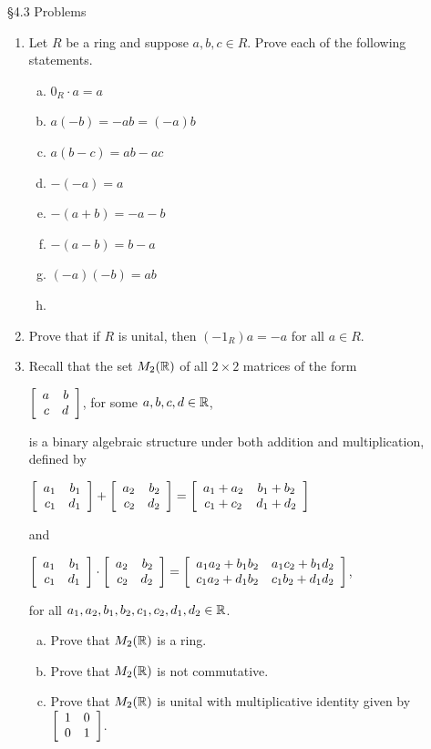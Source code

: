 \documentclass[11pt,fleqn,dvipsnames,usenames]{article}
\begin{document}
{\huge \S4.3 Problems}
\vsp

\begin{enumerate}[1.]
\item Let $R$ be a ring and suppose $a,b,c\in R$.  Prove each of the following statements.
\begin{multicols}{2}
\begin{enumerate}[(a)]
\item $0_{R}\cdot a = a$
\item $a(-b) = -ab = (-a)b$
\item $a(b-c) = ab - ac$
\item $-(-a) = a$
\item $-(a+b) = -a - b$
\item $-(a-b) = b - a$
\item $(-a)(-b) = ab$
\item[\ ] 
\end{enumerate}
\end{multicols}

\item Prove that if $R$ is unital, then $(-1_{R})a = -a$ for all $a\in R$.

\item Recall that the set $M_{2}(\R)$ of all $2\times 2$ matrices of the form
\begin{center}
$\MATRIX{rr}{a & b\\c & d}$, for some $a,b,c,d\in\R$,
\end{center}
is a binary algebraic structure under both addition and multiplication, defined by
\begin{center}
$\MATRIX{rr}{a_1 & b_1\\c_1 & d_1} + \MATRIX{rr}{a_2 & b_2\\c_2 & d_2} = \MATRIX{cc}{a_1 + a_2 & b_1 + b_2\\c_1 + c_2& d_1 + d_2}$
\end{center}
and
\begin{center}
$\MATRIX{rr}{a_1 & b_1\\c_1 & d_1}\cdot \MATRIX{rr}{a_2 & b_2\\c_2 & d_2} = \MATRIX{cc}{a_1a_2 + b_1b_2 & a_1c_2 + b_1d_2\\c_1a_2 + d_1b_2 & c_1b_2 + d_1d_2}$,
\end{center}
for all $a_{1},a_{2},b_{1},b_{2},c_{1},c_{2},d_{1},d_{2}\in\R$.
\vsp
\begin{enumerate}[(a)]
\item Prove that $M_{2}(\R)$ is a ring.
\item Prove that $M_{2}(\R)$ is not commutative.
\item Prove that $M_{2}(\R)$ is unital with multiplicative identity given by $\MATRIX{rr}{1 & 0\\0 & 1}$.
\end{enumerate}


\end{enumerate}
\end{document}
